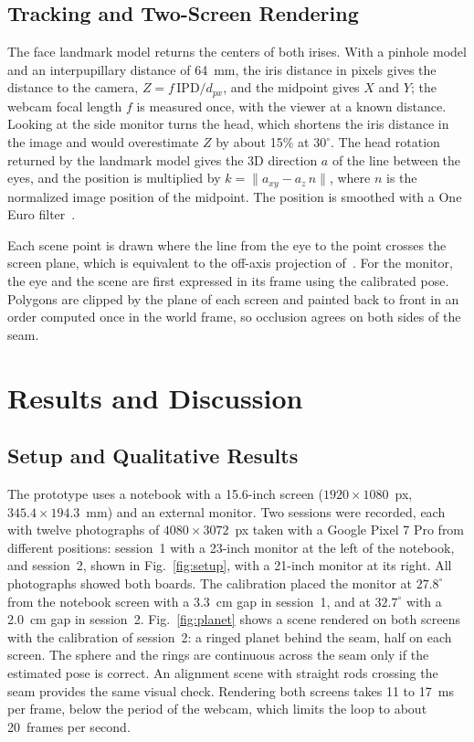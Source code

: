 \documentclass[english,hidelinks]{sbrt}
\begin{document}
\subsection{Tracking and Two-Screen Rendering}
The face landmark model returns the centers of both irises. With a pinhole model and an interpupillary distance of 64~mm, the iris distance in pixels gives the distance to the camera, $Z=f\,\mathrm{IPD}/d_{px}$, and the midpoint gives $X$ and $Y$; the webcam focal length $f$ is measured once, with the viewer at a known distance. Looking at the side monitor turns the head, which shortens the iris distance in the image and would overestimate $Z$ by about 15\% at $30^\circ$. The head rotation returned by the landmark model gives the 3D direction $a$ of the line between the eyes, and the position is multiplied by $k=\|a_{xy}-a_z\,n\|$, where $n$ is the normalized image position of the midpoint. The position is smoothed with a One Euro filter~\cite{casiez2012oneeuro}.

Each scene point is drawn where the line from the eye to the point crosses the screen plane, which is equivalent to the off-axis projection of~\cite{kooima2009generalized}. For the monitor, the eye and the scene are first expressed in its frame using the calibrated pose. Polygons are clipped by the plane of each screen and painted back to front in an order computed once in the world frame, so occlusion agrees on both sides of the seam.

\section{Results and Discussion}
\label{sec:IV}

\subsection{Setup and Qualitative Results}
The prototype uses a notebook with a 15.6-inch screen ($1920\times1080$~px, $345.4\times194.3$~mm) and an external monitor. Two sessions were recorded, each with twelve photographs of $4080\times3072$~px taken with a Google Pixel 7 Pro from different positions: session~1 with a 23-inch monitor at the left of the notebook, and session~2, shown in Fig.~\ref{fig:setup}, with a 21-inch monitor at its right. All photographs showed both boards. The calibration placed the monitor at $27.8^\circ$ from the notebook screen with a 3.3~cm gap in session~1, and at $32.7^\circ$ with a 2.0~cm gap in session~2. Fig.~\ref{fig:planet} shows a scene rendered on both screens with the calibration of session~2: a ringed planet behind the seam, half on each screen. The sphere and the rings are continuous across the seam only if the estimated pose is correct. An alignment scene with straight rods crossing the seam provides the same visual check. Rendering both screens takes 11 to 17~ms per frame, below the period of the webcam, which limits the loop to about 20~frames per second.
\end{document}
